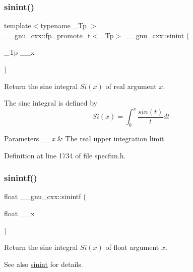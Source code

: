 \subsubsection{\texorpdfstring{sinint()}{sinint()}}
{\footnotesize\ttfamily template$<$typename \+\_\+\+Tp $>$ \\
\+\_\+\+\_\+gnu\+\_\+cxx\+::fp\+\_\+promote\+\_\+t$<$\+\_\+\+Tp$>$ \+\_\+\+\_\+gnu\+\_\+cxx\+::sinint (\begin{DoxyParamCaption}\item[{\+\_\+\+Tp}]{\+\_\+\+\_\+x }\end{DoxyParamCaption})\hspace{0.3cm}{\ttfamily [inline]}}

Return the sine integral $ Si(x) $ of real argument $ x $.

The sine integral is defined by \[ Si(x) = \int_0^x \frac{sin(t)}{t}dt \]


\begin{DoxyParams}{Parameters}
{\em \+\_\+\+\_\+x} & The real upper integration limit \\
\hline
\end{DoxyParams}


Definition at line 1734 of file specfun.\+h.

\mbox{\label{group__gnu__math__spec__func_ga8b63406fec50d7e00470521b82fb32a2}} 
\subsubsection{\texorpdfstring{sinintf()}{sinintf()}}
{\footnotesize\ttfamily float \+\_\+\+\_\+gnu\+\_\+cxx\+::sinintf (\begin{DoxyParamCaption}\item[{float}]{\+\_\+\+\_\+x }\end{DoxyParamCaption})\hspace{0.3cm}{\ttfamily [inline]}}

Return the sine integral $ Si(x) $ of {\ttfamily float} argument $ x $.

\begin{DoxySeeAlso}{See also}
\hyperlink{group__gnu__math__spec__func_ga076c8d52588904f5711c41781f8acfa0}{sinint} for details. 
\end{DoxySeeAlso}


